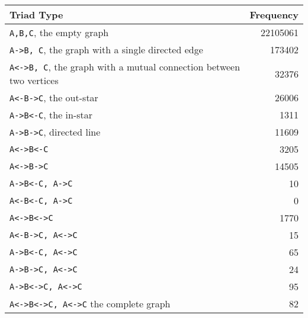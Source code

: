 
\begin{table}
\centering
\begin{tabular}{l r} \hline
\bf Triad Type & \bf Frequency \\ \hline \hline
\verb+A,B,C+, the empty graph& 22105061 \\ 


\verb+A->B, C+, the graph with a single directed edge&173402 \\


\verb+A<->B, C+, the graph with a mutual connection between two vertices& 32376\\


\verb+A<-B->C+, the out-star &26006 \\


\verb+A->B<-C+, the in-star&1311 \\


\verb+A->B->C+, directed line&11609 \\


\verb+A<->B<-C+ &3205 \\


\verb+A<->B->C+&14505\\ 


\verb+A->B<-C, A->C+& 10 \\


\verb+A<-B<-C, A->C+ &0\\ 


\verb+A<->B<->C+ &1770 \\


\verb+A<-B->C, A<->C+ & 15\\


\verb+A->B<-C, A<->C+ & 65\\

\verb+A->B->C, A<->C+&24 \\

\verb+A->B<->C, A<->C+ &95\\


\verb+A<->B<->C, A<->C+ the complete graph&82

\end{tabular}
\end{table}

